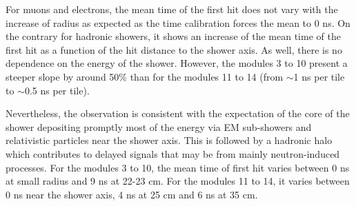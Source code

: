For muons and electrons, the mean time of the first hit does not vary with the increase of radius as expected as the time calibration forces the mean to 0 ns. On the contrary for hadronic showers, it shows an increase of the mean time of the first hit as a function of the hit distance to the shower axis. As well, there is no dependence on the energy of the shower. However, the modules 3 to 10 present a steeper slope by around 50\% than for the modules 11 to 14 (from $\sim$1 ns per tile to $\sim$0.5 ns per tile).

Nevertheless, the observation is consistent with the expectation of the core of the shower depositing promptly most of the energy via EM sub-showers and relativistic particles near the shower axis. This is followed by a hadronic halo which contributes to delayed signals that may be from mainly neutron-induced processes. For the modules 3 to 10, the mean time of first hit varies between 0 ns at small radius and 9 ns at 22-23 cm. For the modules 11 to 14, it varies between 0 ns near the shower axis, 4 ns at 25 cm and 6 ns at 35 cm.


